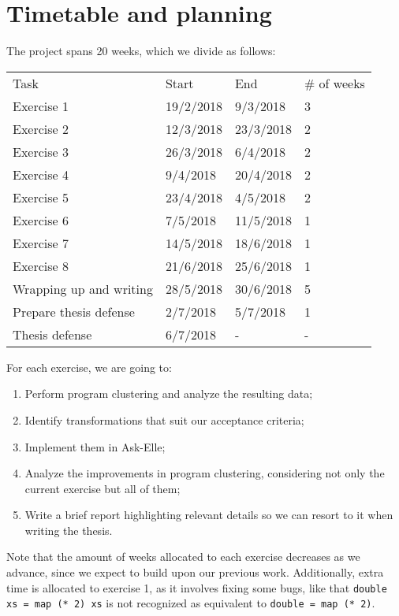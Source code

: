 \chapter{Timetable and planning}
\label{sec:timetable}

The project spans 20 weeks, which we divide as follows:

\bigskip
\begin{tabular}{l l l l}
    Task                    & Start     & End       & \# of weeks \\
    Exercise 1              & 19/2/2018 & 9/3/2018  & 3          \\
    Exercise 2              & 12/3/2018 & 23/3/2018 & 2          \\
    Exercise 3              & 26/3/2018 & 6/4/2018  & 2          \\
    Exercise 4              & 9/4/2018  & 20/4/2018 & 2          \\
    Exercise 5              & 23/4/2018 & 4/5/2018  & 2          \\
    Exercise 6              & 7/5/2018  & 11/5/2018 & 1          \\
    Exercise 7              & 14/5/2018 & 18/6/2018 & 1          \\
    Exercise 8              & 21/6/2018 & 25/6/2018 & 1          \\
    Wrapping up and writing & 28/5/2018 & 30/6/2018 & 5          \\
    Prepare thesis defense  & 2/7/2018  & 5/7/2018  & 1          \\
    Thesis defense          & 6/7/2018  & -         & -
\end{tabular}
\bigskip

For each exercise, we are going to:

\begin{enumerate}
    \item Perform program clustering and analyze the resulting data;
    \item Identify transformations that suit our acceptance criteria;
    \item Implement them in Ask-Elle;
    \item Analyze the improvements in program clustering, considering not only the current exercise but all of them;
    \item Write a brief report highlighting relevant details so we can resort to it when writing the thesis.
\end{enumerate}

Note that the amount of weeks allocated to each exercise decreases as we advance, since we expect to build upon our previous work. Additionally, extra time is allocated to exercise 1, as it involves fixing some bugs, like that \texttt{double xs = map (* 2) xs} is not recognized as equivalent to \texttt{double = map (* 2)}.
